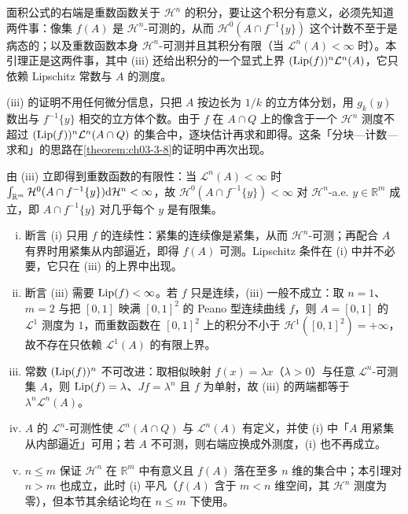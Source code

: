 \documentclass[../../main.tex]{subfiles}%
\begin{document}
\begin{remark}\label{remark:ch03-lem-3-2-动机}
面积公式的右端是重数函数关于 $\mathcal{H}^n$ 的积分，要让这个积分有意义，必须先知道两件事：像集 $f(A)$ 是 $\mathcal{H}^n$-可测的，从而 $\mathcal{H}^0(A\cap f^{-1}\{y\})$ 这个计数不至于是病态的；以及重数函数本身 $\mathcal{H}^n$-可测并且其积分有限（当 $\mathcal{L}^n(A)<\infty$ 时）。本引理正是这两件事，其中 (iii) 还给出积分的一个显式上界 $(\operatorname{Lip}(f))^n\mathcal{L}^n(A)$，它只依赖 Lipschitz 常数与 $A$ 的测度。

(iii) 的证明不用任何微分信息，只把 $A$ 按边长为 $1/k$ 的立方体分划，用 $g_k(y)$ 数出与 $f^{-1}\{y\}$ 相交的立方体个数。由于 $f$ 在 $A\cap Q$ 上的像含于一个 $\mathcal{H}^n$ 测度不超过 $(\operatorname{Lip}(f))^n\mathcal{L}^n(A\cap Q)$ 的集合中，逐块估计再求和即得。这条「分块—计数—求和」的思路在\cref{theorem:ch03-3-8}的证明中再次出现。%

由 (iii) 立即得到重数函数的有限性：当 $\mathcal{L}^n(A)<\infty$ 时 $\int_{\mathbb{R}^m}\mathcal{H}^0(A\cap f^{-1}\{y\})\mathrm{d}\mathcal{H}^n<\infty$，故 $\mathcal{H}^0(A\cap f^{-1}\{y\})<\infty$ 对 $\mathcal{H}^n$-a.e. $y\in\mathbb{R}^m$ 成立，即 $A\cap f^{-1}\{y\}$ 对几乎每个 $y$ 是有限集。
\end{remark}

\begin{remark}\label{remark:ch03-lem-3-2-条件}
\begin{enumerate}[(i)]
\item 断言 (i) 只用 $f$ 的连续性：紧集的连续像是紧集，从而 $\mathcal{H}^n$-可测；再配合 $A$ 有界时用紧集从内部逼近，即得 $f(A)$ 可测。Lipschitz 条件在 (i) 中并不必要，它只在 (iii) 的上界中出现。
\item 断言 (iii) 需要 $\operatorname{Lip}(f)<\infty$。若 $f$ 只是连续，(iii) 一般不成立：取 $n=1$、$m=2$ 与把 $[0,1]$ 映满 $[0,1]^2$ 的 Peano 型连续曲线 $f$，则 $A=[0,1]$ 的 $\mathcal{L}^1$ 测度为 $1$，而重数函数在 $[0,1]^2$ 上的积分不小于 $\mathcal{H}^1([0,1]^2)=+\infty$，故不存在只依赖 $\mathcal{L}^1(A)$ 的有限上界。
\item 常数 $(\operatorname{Lip}(f))^n$ 不可改进：取相似映射 $f(x)=\lambda x$（$\lambda>0$）与任意 $\mathcal{L}^n$-可测集 $A$，则 $\operatorname{Lip}(f)=\lambda$、$Jf=\lambda^n$ 且 $f$ 为单射，故 (iii) 的两端都等于 $\lambda^n\mathcal{L}^n(A)$。
\item $A$ 的 $\mathcal{L}^n$-可测性使 $\mathcal{L}^n(A\cap Q)$ 与 $\mathcal{L}^n(A)$ 有定义，并使 (i) 中「$A$ 用紧集从内部逼近」可用；若 $A$ 不可测，则右端应换成外测度，(i) 也不再成立。
\item $n\leqslant m$ 保证 $\mathcal{H}^n$ 在 $\mathbb{R}^m$ 中有意义且 $f(A)$ 落在至多 $n$ 维的集合中；本引理对 $n>m$ 也成立，此时 (i) 平凡（$f(A)$ 含于 $m<n$ 维空间，其 $\mathcal{H}^n$ 测度为零），但本节其余结论均在 $n\leqslant m$ 下使用。
\end{enumerate}
\end{remark}
\end{document}
